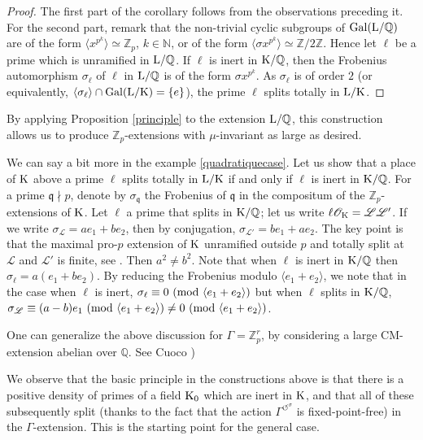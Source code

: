 \documentclass[12pt,a4paper,twoside,english]{smfart}
\def\K{{\rm K}}
\def\L{{\rm L}}
\def\Q{{\mathbb Q}}
\def\Z{{\mathbb Z}}
\def\Nat{{\mathbb N}}
\def\O{{\mathcal O}}
\def\ll{{\mathcal L}}
\def\q{{\mathfrak q}}
\def\Gal{{\rm Gal}}
\def\mod{{\rm mod}}
\def\act#1{{\displaystyle{#1^{\circlearrowleft^\sigma}}}}
\begin{document}
\begin{proof}
The first part of the corollary follows from the observations preceding it.  For the second part, remark that the non-trivial cyclic subgroups of $\Gal(\L/\Q)$ are of the form $\langle x^{p^k} \rangle \simeq \Z_p$, $k\in \Nat$,  or of the form  $\langle \sigma x^{p^k} \rangle \simeq \Z/2\Z$.  Hence let  $\ell$ be a prime which is unramified in $\L/\Q$. If $\ell$ is inert in $\K/\Q$, then the Frobenius automorphism  $\sigma_\ell$ of $\ell$ in $\L/\Q$ is of the form $\sigma x^{p^k}$. As $\sigma_\ell$ is of order $2$ (or equivalently, $\langle \sigma_\ell \rangle \cap \Gal(\L/\K)=\{e\}$), the prime $\ell$ splits totally in $\L/\K$. 
\end{proof}
  
 
By applying Proposition  \ref{principle} to the extension $\L/\Q$, this construction allows us to produce $\Z_p$-extensions with  $\mu$-invariant as large as desired.

 
\begin{rema}
We can say a bit more in the example \ref{quadratiquecase}. Let us show that a place of $\K$ above a prime $\ell$ splits totally in $\L/\K$ if and only if $\ell$ is inert in $\K/\Q$. For a prime $\q \nmid p$, denote by  $\sigma_\q$ the Frobenius of $\q$ in the compositum  of the $\Z_p$-extensions of $\K$.
Let $\ell$ a prime that splits in $\K/\Q$; let us write $\ell\O_\K=\ll \ll'$.   If we write $\sigma_{\ll}=ae_1+be_2$, then by conjugation, $\sigma_{\ll'}=be_1+ae_2$.  The key point is that the maximal pro-$p$ extension of $\K$ unramified outside $p$ and totally split at $\ll$ and $\ll'$ is finite, see \cite{gras}. Then $a^2\neq b^2$. Note that when $\ell$ is inert in $\K/\Q$ then $\sigma_\ell=a(e_1+be_2)$.
By reducing the Frobenius modulo $\langle e_1+e_2\rangle$, we note that in the case when $\ell$ is inert,  $\sigma_\ell \equiv 0 \  (\mod \ \langle e_1+e_2\rangle)$ but when $\ell$ splits in $\K/\Q$, $\sigma_{\ll}\equiv (a-b)e_1 \ (\mod  \ \langle e_1+e_2\rangle) \neq 0 \ (\mod  \ \langle e_1+e_2\rangle) $.
\end{rema} 
 
 \begin{rema}
One can generalize the above discussion for $\Gamma=\Z_p^r$, by considering a large CM-extension abelian over $\Q$. See  Cuoco \cite[Theorem 5.2]{cuoco})
 \end{rema}
 
 
 \begin{rema}
We observe that the basic principle in the constructions above is that there is a positive density of primes of a field $\K_0$ which are inert in $\K$, and that all of these subsequently split (thanks to the fact that the action $\act{\Gamma}$ is fixed-point-free) in the $\Gamma$-extension. This is the starting point for the general case.
 \end{rema}
 
\end{document}
